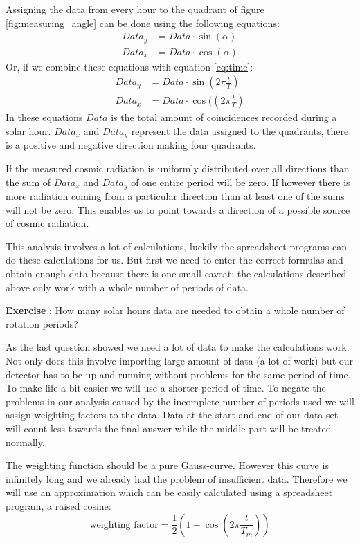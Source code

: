 \documentclass[12pt,a4paper]{article}
\numberwithin{equation}{section}
\numberwithin{figure}{section}
\newcounter{Exercise}
\numberwithin{table}{section}
\begin{document}
Assigning the data from every hour to the quadrant of figure \ref{fig:measuring_angle} can be done using the following equations:
\begin{align} Data_y &= Data \cdot \sin(\alpha) \\ Data_x &= Data \cdot \cos(\alpha) \end{align}
Or, if we combine these equations with equation \ref{eq:time}:
\begin{align} Data_y &= Data \cdot \sin\left( 2 \pi \frac{t}{T}\right)  \\ Data_x &= Data \cdot \cos(\left( 2 \pi \frac{t}{T}\right) \end{align}
In these equations $Data$ is the total amount of coincidences recorded during a solar hour. $Data_x$ and $Data_y$ represent the data assigned to the quadrants, there is a positive and negative direction making four quadrants.

If the measured cosmic radiation is uniformly distributed over all directions than the sum of $Data_x$ and $Data_y$ of one entire period will be zero. If however there is more radiation coming from a particular direction than at least one of the sums will not be zero. This enables us to point towards a direction of a possible source of cosmic radiation.

This analysis involves a lot of calculations, luckily the spreadsheet programs can do these calculations for us. But first we need to enter the correct formulas and obtain enough data because there is one small caveat: the calculations described above only work with a whole number of periods of data.

\begin{shaded}
\textbf{Exercise \theExercise {}} : How many solar hours data are needed to obtain a whole number of rotation periods?\end{shaded}

As the last question showed we need a lot of data to make the calculations work. Not only does this involve importing large amount of data (a lot of work) but our detector has to be up and running without problems for the same period of time. To make life a bit easier we will use a shorter period of time. To negate the problems in our analysis caused by the incomplete number of periods used we will assign weighting factors to the data. Data at the start and end of our data set will count less towards the final answer while the middle part will be treated normally. 

The weighting function should be a pure Gauss-curve. However this curve is infinitely long and we already had the problem of insufficient data. Therefore we will use an approximation which can be easily calculated using a spreadsheet program, a raised cosine:
\begin{equation} \mbox{weighting factor} = \frac{1}{2} \left( 1 - \cos\left( 2 \pi \frac{t}{T_m}\right) \right) \end{equation}
\end{document}

